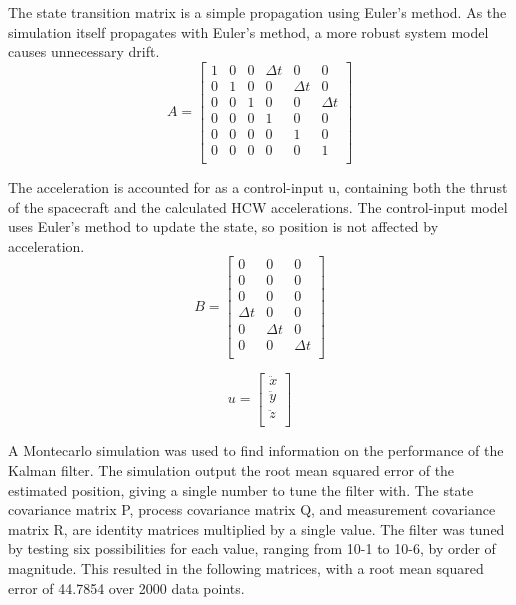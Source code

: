 \documentclass[]{aiaa-tc}%
\begin{document}
The state transition matrix is a simple propagation using Euler's method.  As the simulation itself propagates with Euler's method, a more robust system model causes unnecessary drift.
\begin{equation}
A = \begin{bmatrix}
1&0&0&\Delta t&0&0 \\
0&1&0&0&\Delta t&0 \\
0&0&1&0&0&\Delta t \\
0&0&0&1&0&0 \\
0&0&0&0&1&0 \\
0&0&0&0&0&1 \\
\end{bmatrix}
\end{equation}
  
  The acceleration is accounted for as a control-input u, containing both the thrust of the spacecraft and the calculated HCW accelerations.  The control-input model uses Euler’s method to update the state, so position is not affected by acceleration.
\begin{equation}
B = \begin{bmatrix}
0&0&0 \\
0&0&0 \\
0&0&0 \\
\Delta t&0&0 \\
0&\Delta t&0 \\
0&0&\Delta t \\
\end{bmatrix}
\end{equation}

\begin{equation}
u = \begin{bmatrix}
\ddot{x} \\
\ddot{y} \\
\ddot{z} \\

\end{bmatrix}
\end{equation}
  
  A Montecarlo simulation was used to find information on the performance of the Kalman filter.  The simulation output the root mean squared error of the estimated position, giving a single number to tune the filter with.  The state covariance matrix P, process covariance matrix Q, and measurement covariance matrix R, are identity matrices multiplied by a single value.  The filter was tuned by testing six possibilities for each value, ranging from 10-1 to 10-6, by order of magnitude.  This resulted in the following matrices, with a root mean squared error of 44.7854 over 2000 data points.
  
\end{document}
